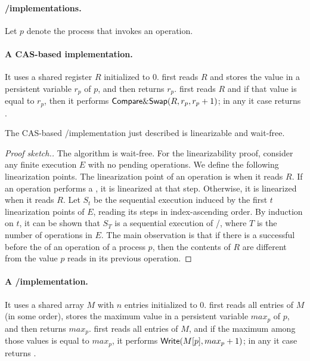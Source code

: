 \paragraph{\LL/\IC implementations.} Let $p$ denote the process that invokes an operation.

\paragraph{A CAS-based implementation.}
It uses a shared register $R$ initialized to 0.  \LL first reads $R$ and stores the value in a persistent variable $r_p$ of $p$, and then returns $r_p$.  \IC first reads $R$ and if that value is equal to $r_p$, then it performs ${\sf \small Compare\&Swap}(R, r_p, r_p+1)$; in any it case returns \ok.

\begin{theorem}
The CAS-based \LL/\IC implementation just described is linearizable and wait-free.
\end{theorem}

\begin{proof}[Proof sketch.]
  The algorithm is wait-free.  For the linearizability proof, consider any finite execution $E$ with no pending operations.  We define the following linearization points.  The linearization point of an \LL operation is when it reads $R$.  If an \IC operation performs a \CAS, it is linearized at that step. Otherwise, it is linearized when it reads $R$.  Let $S_t$ be the sequential execution induced by the first $t$ linearization points of $E$, reading its steps in index-ascending order.  By induction on $t$, it can be shown that $S_T$ is a sequential execution of \LL/\IC, where $T$ is the number of operations in $E$.  The main observation is that if there is a successful \CAS before the \CAS of an \IC operation of a process $p$, then the contents of $R$ are different from the value $p$ reads in its previous \LL operation.
\end{proof}

\paragraph{A \R/\W implementation.}
It uses a shared array $M$ with $n$ entries initialized to 0.  \LL first reads all entries of $M$ (in some order), stores the maximum value in a persistent variable $max_p$ of $p$, and then returns $max_p$.  \IC first reads all entries of $M$, and if the maximum among those values is equal to $max_p$, it performs ${\sf \small Write}(M[p], max_p + 1)$; in any it case returns \ok.

